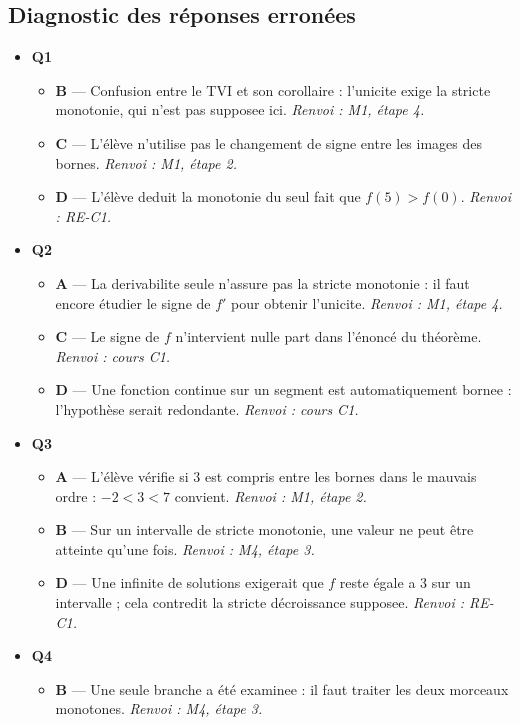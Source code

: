 \subsection*{Diagnostic des réponses erronées}

\begin{itemize}
  \item \textbf{Q1}
  \begin{itemize}
    \item \textbf{B} — Confusion entre le TVI et son corollaire : l'unicite exige la stricte monotonie, qui n'est pas supposee ici. \emph{Renvoi : M1, étape 4.}
    \item \textbf{C} — L'élève n'utilise pas le changement de signe entre les images des bornes. \emph{Renvoi : M1, étape 2.}
    \item \textbf{D} — L'élève deduit la monotonie du seul fait que $f(5) > f(0)$. \emph{Renvoi : RE-C1.}
  \end{itemize}
  \item \textbf{Q2}
  \begin{itemize}
    \item \textbf{A} — La derivabilite seule n'assure pas la stricte monotonie : il faut encore étudier le signe de $f'$ pour obtenir l'unicite. \emph{Renvoi : M1, étape 4.}
    \item \textbf{C} — Le signe de $f$ n'intervient nulle part dans l'énoncé du théorème. \emph{Renvoi : cours C1.}
    \item \textbf{D} — Une fonction continue sur un segment est automatiquement bornee : l'hypothèse serait redondante. \emph{Renvoi : cours C1.}
  \end{itemize}
  \item \textbf{Q3}
  \begin{itemize}
    \item \textbf{A} — L'élève vérifie si $3$ est compris entre les bornes dans le mauvais ordre : $-2 < 3 < 7$ convient. \emph{Renvoi : M1, étape 2.}
    \item \textbf{B} — Sur un intervalle de stricte monotonie, une valeur ne peut être atteinte qu'une fois. \emph{Renvoi : M4, étape 3.}
    \item \textbf{D} — Une infinite de solutions exigerait que $f$ reste égale a $3$ sur un intervalle ; cela contredit la stricte décroissance supposee. \emph{Renvoi : RE-C1.}
  \end{itemize}
  \item \textbf{Q4}
  \begin{itemize}
    \item \textbf{B} — Une seule branche a été examinee : il faut traiter les deux morceaux monotones. \emph{Renvoi : M4, étape 3.}

\end{itemize}
\end{itemize}
